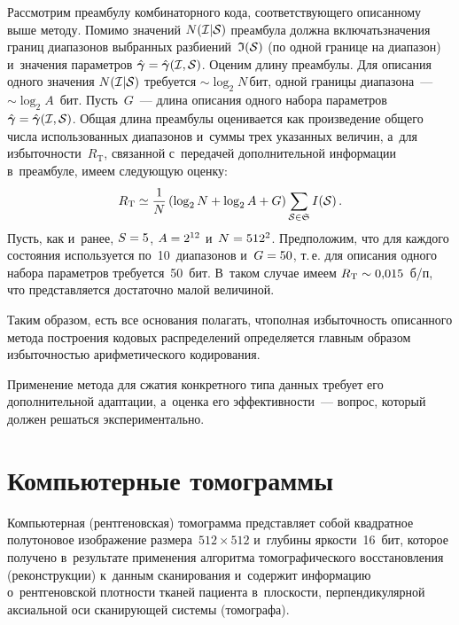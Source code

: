 \begin{multicols}{2}
Рассмотрим преамбулу комбинаторного кода, соответствующего описанному выше методу. 
Помимо значений $N({\cal I}|{\cal S})$ преамбула должна включать\linebreak значения 
границ диапазонов выбранных раз\-би\-ений~${\frak I}({\cal S})$ (по одной границе на 
диапазон) и~значения параметров 
$\hat{\boldsymbol{\gamma}}\hm=\hat{\boldsymbol{\gamma}}({\cal I},{\cal S})$. 
Оценим длину преамбулы. Для описания одного значения $N({\cal I}|{\cal S})$\linebreak 
требуется $\sim\log_{2}N$\,бит, одной границы диапазона~---   $\sim\log_{2}A$~бит. 
Пусть~$G$~--- длина описания одного набора параметров  $\hat{\boldsymbol{\gamma}}\hm=
\hat{\boldsymbol{\gamma}}({\cal I},{\cal S})$. Общая длина преамбулы оценивается 
как произведение общего числа использованных диапазонов и~суммы трех указанных 
величин, а~для избыточности~$R_{\mathrm{T}}$, 
связанной с~передачей дополнительной информации в~преамбуле, имеем следующую оценку:
$$
R_{\mathrm{T}} \simeq \displaystyle\frac{\displaystyle 1\mathstrut}{\displaystyle N\mathstrut} \left( 
\log_{2}N+\log_{2}A +G\right) \sum\limits_{{\cal S}\in{\frak S}}I({\cal S)}\,.
$$
Пусть, как и~ранее, $S\hm=5$, $A\hm=2^{12}$ и~$N\hm=512^{2}$. 
Предположим, что для каждого состояния используется по~10~диапазонов и~$G\hm=50$, 
т.\,е. для описания одного набора параметров требуется~50~бит. 
В~таком случае имеем $R_{\mathrm{T}}\hm\sim 0{,}015$~б/п, 
что представляется достаточно малой величиной.

Таким образом, есть все основания полагать, что\linebreak полная избыточность 
описанного метода по\-стро\-ения кодовых распределений определяется главным образом 
избыточностью арифметического кодирова\-ния. 

Применение метода для сжатия конкретного 
типа данных требует его дополнительной адап\-та\-ции, а~оценка его эффективности~--- 
вопрос, который должен решаться экспериментально.

\section{Компьютерные томограммы}

\vspace*{-9pt}

Компьютерная (рентгеновская) томограмма представляет собой квадратное 
полутоновое изоб\-ра\-же\-ние размера~$512\times512$ и~глубины яр\-кости~16~бит,\linebreak 
которое получено в~результате применения алгоритма томографического восстановления 
(реконструкции) к~данным сканирования и~содержит информацию о~рентгеновской 
плотности тканей пациен\-та в~плоскости, перпендикулярной аксиальной оси сканирующей 
системы (томографа).


\end{multicols}
